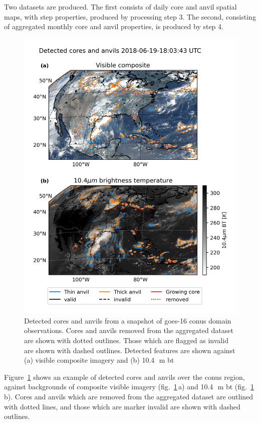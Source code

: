 Two datasets are produced. The first consists of daily core and anvil spatial maps, with step properties, produced by processing step 3. 
The second, consisting of aggregated monthly core and anvil properties, is produced by step 4.

\begin{figure}[tp]
    \centering
    \includegraphics[width=\textwidth]{figures/chapter2_02.png}
    \caption[
    Detected cores and anvils from a snapshot of \acrshort{goes}-16 \acrshort{conus} domain observations
    ]{
    Detected cores and anvils from a snapshot of \acrshort{goes}-16 \acrshort{conus} domain observations. Cores and anvils removed from the aggregated dataset are shown with dotted outlines. Those which are flagged as invalid are shown with dashed outlines. Detected features are shown against (a) visible composite imagery and (b) 10.4\,\unit{\mu m} \acrshort{bt}
    }
    \label{fig:conus_detected_dccs}
\end{figure}

Figure~\ref{fig:conus_detected_dccs} shows an example of detected cores and anvils over the \acrshort{conus} region, against backgrounds of composite visible imagery (fig.~\ref{fig:conus_detected_dccs}\,a) and 10.4\,\unit{\mu m} \acrshort{bt} (fig.~\ref{fig:conus_detected_dccs}\,b).
Cores and anvils which are removed from the aggregated dataset are outlined with dotted lines, and those which are marker invalid are shown with dashed outlines.

